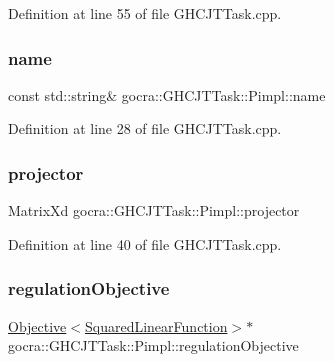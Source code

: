 Definition at line 55 of file G\+H\+C\+J\+T\+Task.\+cpp.

\hypertarget{structgocra_1_1GHCJTTask_1_1Pimpl_a62bf1c09164be6cf8a48360bd6e53d64}{}\label{structgocra_1_1GHCJTTask_1_1Pimpl_a62bf1c09164be6cf8a48360bd6e53d64} 
\subsubsection{\texorpdfstring{name}{name}}
{\footnotesize\ttfamily const std\+::string\& gocra\+::\+G\+H\+C\+J\+T\+Task\+::\+Pimpl\+::name}



Definition at line 28 of file G\+H\+C\+J\+T\+Task.\+cpp.

\hypertarget{structgocra_1_1GHCJTTask_1_1Pimpl_ab17e7af214e9801bfb03e4d9ed6dad29}{}\label{structgocra_1_1GHCJTTask_1_1Pimpl_ab17e7af214e9801bfb03e4d9ed6dad29} 
\subsubsection{\texorpdfstring{projector}{projector}}
{\footnotesize\ttfamily Matrix\+Xd gocra\+::\+G\+H\+C\+J\+T\+Task\+::\+Pimpl\+::projector}



Definition at line 40 of file G\+H\+C\+J\+T\+Task.\+cpp.

\hypertarget{structgocra_1_1GHCJTTask_1_1Pimpl_a59fe897e1cfa0a5b28a52f0d1be7d13d}{}\label{structgocra_1_1GHCJTTask_1_1Pimpl_a59fe897e1cfa0a5b28a52f0d1be7d13d} 
\subsubsection{\texorpdfstring{regulation\+Objective}{regulationObjective}}
{\footnotesize\ttfamily \hyperlink{classocra_1_1Objective}{Objective}$<$\hyperlink{classocra_1_1SquaredLinearFunction}{Squared\+Linear\+Function}$>$$\ast$ gocra\+::\+G\+H\+C\+J\+T\+Task\+::\+Pimpl\+::regulation\+Objective}



